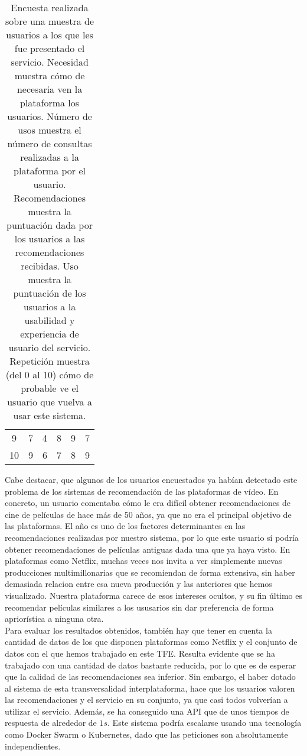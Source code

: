 \begin{table}[H]
{\begin{tabular}{cccccc}
9                                     & 7                                       & 4                                            & 8                                             & 9                                 & 7                                       \\
10                                    & 9                                       & 6                                            & 7                                             & 8                                 & 9                                      
\end{tabular}%
}
\caption{Encuesta realizada sobre una muestra de usuarios a los que les fue presentado el servicio. Necesidad muestra cómo de necesaria ven la plataforma los usuarios. Número de usos muestra el número de consultas realizadas a la plataforma por el usuario. Recomendaciones muestra la puntuación dada por los usuarios a las recomendaciones recibidas. Uso muestra la puntuación de los usuarios a la usabilidad y experiencia de usuario del servicio. Repetición muestra (del 0 al 10) cómo de probable ve el usuario que vuelva a usar este sistema.}
\label{tab:satisfaction}
\end{table}

Cabe destacar, que algunos de los usuarios encuestados ya habían detectado este problema de los sistemas de recomendación de las plataformas de vídeo. En concreto, un usuario comentaba cómo le era difícil obtener recomendaciones de cine de películas de hace más de 50 años, ya que no era el principal objetivo de las plataformas. El año es uno de los factores determinantes en las recomendaciones realizadas por nuestro sistema, por lo que este usuario sí podría obtener recomendaciones de películas antiguas dada una que ya haya visto. En plataformas como Netflix, muchas veces nos invita a ver simplemente nuevas producciones multimillonarias que se recomiendan de forma extensiva, sin haber demasiada relacion entre esa nueva producción y las anteriores que hemos visualizado. Nuestra plataforma carece de esos intereses ocultos, y su fin último es recomendar películas similares a los ususarios sin dar preferencia de forma apriorística a ninguna otra.\\

Para evaluar los resultados obtenidos, también hay que tener en cuenta la cantidad de datos de los que disponen plataformas como Netflix y el conjunto de datos con el que hemos trabajado en este TFE. Resulta evidente que se ha trabajado con una cantidad de datos bastante reducida, por lo que es de esperar que la calidad de las recomendaciones sea inferior. Sin embargo, el haber dotado al sistema de esta transversalidad interplataforma, hace que los usuarios valoren las recomendaciones y el servicio en su conjunto, ya que casi todos volverían a utilizar el servicio. Además, se ha conseguido una API que de unos tiempos de respuesta de alrededor de $1 s$. Este sistema podría escalarse usando una tecnología como Docker Swarm o Kubernetes, dado que las peticiones son absolutamente independientes.\\

